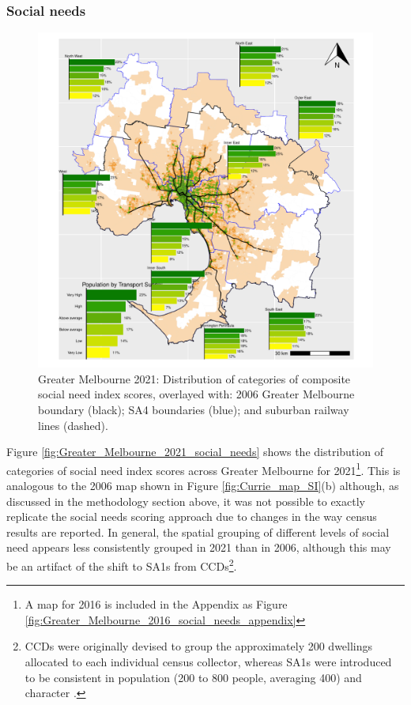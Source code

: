\documentclass[preprint, 3p,
authoryear]{elsarticle} %
\begin{document}
\subsubsection{Social needs}\label{social-needs}

\begin{figure}
\centering
\includegraphics{ReynoldsCurrieQu2024_files/figure-latex/Greater_Melbourne_2021_social_needs-1.pdf}
\caption{Greater Melbourne 2021: Distribution of categories of composite
social need index scores, overlayed with: 2006 Greater Melbourne
boundary (black); SA4 boundaries (blue); and suburban railway lines
(dashed).}
\end{figure}

Figure \ref{fig:Greater_Melbourne_2021_social_needs} shows the
distribution of categories of social need index scores across Greater
Melbourne for 2021\footnote{A map for 2016 is included in the Appendix
  as Figure \ref{fig:Greater_Melbourne_2016_social_needs_appendix}}.
This is analogous to the 2006 map shown in Figure
\ref{fig:Currie_map_SI}(b) although, as discussed in the methodology
section above, it was not possible to exactly replicate the
\citet{currie2010identifying} social needs scoring approach due to
changes in the way census results are reported. In general, the spatial
grouping of different levels of social need appears less consistently
grouped in 2021 than in 2006, although this may be an artifact of the
shift to SA1s from CCDs\footnote{CCDs were originally devised to group
  the approximately 200 dwellings allocated to each individual census
  collector, whereas SA1s were introduced to be consistent in population
  (200 to 800 people, averaging 400) and character
  \citep{ABS_SA1s_CCDs}.}.
\end{document}
